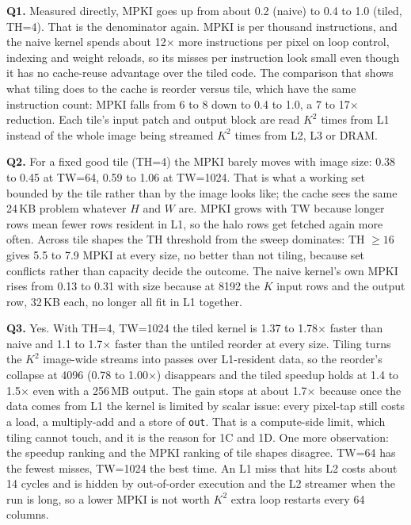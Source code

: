 \documentclass[11pt,a4paper]{article}
\begin{document}
\textbf{Q1.} Measured directly, MPKI goes up from about 0.2 (naive) to 0.4 to 1.0 (tiled, TH=4). That is the denominator again. MPKI is per thousand instructions, and the naive kernel spends about 12$\times$ more instructions per pixel on loop control, indexing and weight reloads, so its misses per instruction look small even though it has no cache-reuse advantage over the tiled code. The comparison that shows what tiling does to the cache is reorder versus tile, which have the same instruction count: MPKI falls from 6 to 8 down to 0.4 to 1.0, a 7 to 17$\times$ reduction. Each tile's input patch and output block are read $K^2$ times from L1 instead of the whole image being streamed $K^2$ times from L2, L3 or DRAM.

\textbf{Q2.} For a fixed good tile (TH=4) the MPKI barely moves with image size: 0.38 to 0.45 at TW=64, 0.59 to 1.06 at TW=1024. That is what a working set bounded by the tile rather than by the image looks like; the cache sees the same 24\,KB problem whatever $H$ and $W$ are. MPKI grows with TW because longer rows mean fewer rows resident in L1, so the halo rows get fetched again more often. Across tile shapes the TH threshold from the sweep dominates: TH $\ge 16$ gives 5.5 to 7.9 MPKI at every size, no better than not tiling, because set conflicts rather than capacity decide the outcome. The naive kernel's own MPKI rises from 0.13 to 0.31 with size because at 8192 the $K$ input rows and the output row, 32\,KB each, no longer all fit in L1 together.

\textbf{Q3.} Yes. With TH=4, TW=1024 the tiled kernel is 1.37 to 1.78$\times$ faster than naive and 1.1 to 1.7$\times$ faster than the untiled reorder at every size. Tiling turns the $K^2$ image-wide streams into passes over L1-resident data, so the reorder's collapse at 4096 (0.78 to 1.00$\times$) disappears and the tiled speedup holds at 1.4 to 1.5$\times$ even with a 256\,MB output. The gain stops at about 1.7$\times$ because once the data comes from L1 the kernel is limited by scalar issue: every pixel-tap still costs a load, a multiply-add and a store of \texttt{out}. That is a compute-side limit, which tiling cannot touch, and it is the reason for 1C and 1D. One more observation: the speedup ranking and the MPKI ranking of tile shapes disagree. TW=64 has the fewest misses, TW=1024 the best time. An L1 miss that hits L2 costs about 14 cycles and is hidden by out-of-order execution and the L2 streamer when the run is long, so a lower MPKI is not worth $K^2$ extra loop restarts every 64 columns.
\end{document}
